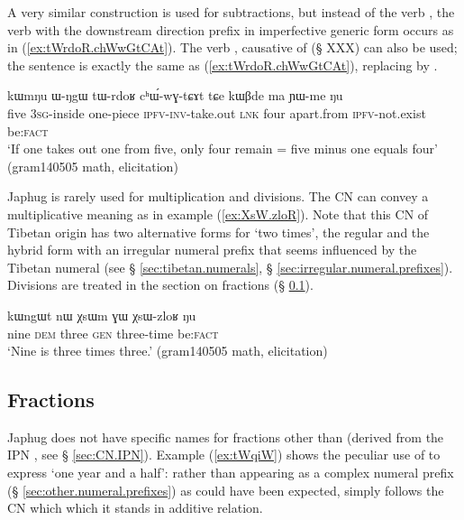 A very similar construction is used for subtractions, but instead of the verb  , the verb  with the downstream direction prefix in imperfective generic form  occurs as in (\ref{ex:tWrdoR.chWwGtCAt}). The verb , causative of  (§ XXX) can also be used; the sentence is exactly the same as (\ref{ex:tWrdoR.chWwGtCAt}), replacing   by  .

\begin{exe}
\ex \label{ex:tWrdoR.chWwGtCAt}
 \gll kɯmŋu ɯ-ŋgɯ tɯ-rdoʁ cʰɯ́-wɣ-tɕɤt tɕe kɯβde ma ɲɯ-me ŋu \\
 five \textsc{3sg}-inside one-piece \textsc{ipfv}-\textsc{inv}-take.out \textsc{lnk} four apart.from \textsc{ipfv}-not.exist be:\textsc{fact} \\
 \glt `If one takes out one from five, only four remain = five minus one equals four' (gram140505 math, elicitation)
\end{exe}

Japhug is rarely used for multiplication and divisions. The CN  can convey a multiplicative meaning  as in example (\ref{ex:XsW.zloR}). Note that this CN of Tibetan origin has two alternative forms for `two times', the regular   and the hybrid form  with an irregular numeral prefix that seems influenced by the Tibetan numeral  (see § \ref{sec:tibetan.numerals}, § \ref{sec:irregular.numeral.prefixes}). Divisions are treated in the section on fractions (§ \ref{sec:fractions}).

\begin{exe}
\ex \label{ex:XsW.zloR}
 \gll  kɯngɯt nɯ χsɯm ɣɯ χsɯ-zloʁ ŋu \\
 nine \textsc{dem} three \textsc{gen} three-time be:\textsc{fact} \\
  \glt `Nine is three times three.' (gram140505 math, elicitation)
\end{exe}
 
 
\subsection{Fractions} \label{sec:fractions}
Japhug does not have specific names for fractions other than  (derived from the IPN , see § \ref{sec:CN.IPN}). Example (\ref{ex:tWqiW}) shows the peculiar use of  to express `one year and a half': rather than appearing as a complex numeral prefix (§ \ref{sec:other.numeral.prefixes}) as could have been expected,    simply follows the CN  which which it stands in additive relation.

